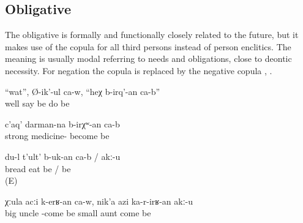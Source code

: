 
\subsection{Obligative}
\label{ssec:Obligative}

The obligative is formally and functionally closely related to the future, but it makes use of the copula for all third persons instead of person enclitics. The meaning is usually modal referring to needs and obligations, close to deontic necessity. For negation the copula  is replaced by the negative copula  , .
%
\begin{exe}
	\ex	\label{ex:Well, he says, this needs to be done}
	\gll	``wat'',	Ø-ik'-ul	ca-w,	``heχ	b-irq'-an	ca-b''	\\
		well	say	be		do	be\\
	\glt	{}


	\ex	\label{ex:It must be a strong medicine}
	\gll	c'aq'	darman-na	b-irχʷ-an	ca-b\\
		strong		medicine-	become	be\\
	\glt	{}


	\ex	\label{ex:I have / do not have to eat bread}
	\gll	du-l t'ult' b-uk-an	ca-b	/	akː-u\\
			bread	eat	be /	be\\
	\glt	{} (E)
	
	\ex	\label{ex:The elder uncle has to go; the younger aunt should not go}
	\gll	χːula	acːi	k-erʁ-an	ca-w,	nik'a	azi	ka-r-irʁ-an	akː-u\\
		big	uncle	-come	be	small	aunt	come	be\\
	\glt	{}
\end{exe}



